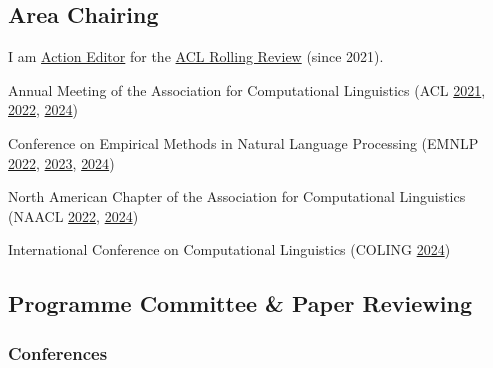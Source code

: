 \subsection*{Area Chairing}

I am \href{https://aclrollingreview.org/aes}{Action Editor} for the \href{https://aclrollingreview.org/}{ACL Rolling Review} (since 2021).

\begin{itemize*}[label={},
                 itemjoin={{,\space}},
                 afterlabel={},
                 after={{.}}]

    \item Annual Meeting of the Association for Computational Linguistics
    (ACL
    \href{https://aclanthology.org/2021.acl-long.0.pdf}{2021},
    \href{https://aclanthology.org/2022.acl-long.0.pdf}{2022},
    \href{https://aclanthology.org/2024.acl-long.0.pdf}{2024})

    \item Conference on Empirical Methods in Natural Language Processing
    (EMNLP 
    \href{https://aclanthology.org/2022.emnlp-main.0.pdf}{2022},
    \href{https://aclanthology.org/2023.emnlp-main.0.pdf}{2023},
    \href{https://aclanthology.org/2024.emnlp-main.0.pdf}{2024})

    \item North American Chapter of the Association for Computational Linguistics 
    (NAACL
    \href{https://aclanthology.org/2022.naacl-main.0.pdf}{2022},
    \href{https://aclanthology.org/2024.naacl-long.0.pdf}{2024})

    \item International Conference on Computational Linguistics
    (COLING
    \href{https://aclanthology.org/2024.lrec-main.0.pdf}{2024})
    
\end{itemize*}

\subsection*{Programme Committee \& Paper Reviewing}

\subsubsection*{Conferences}

